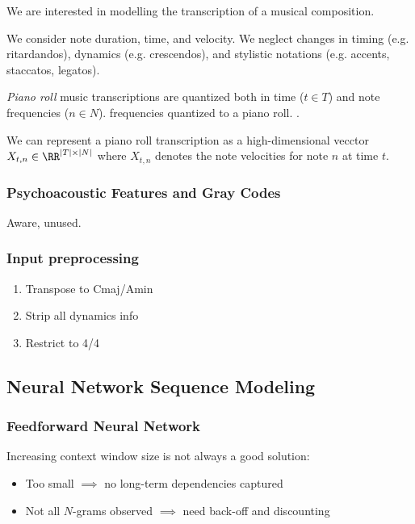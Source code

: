\documentclass[a4paper,oneside,reqno,onecolumn]{amsart}
\begin{document}
We are interested in modelling the transcription of a musical composition.

We consider note duration, time, and velocity. We neglect changes in timing
(e.g. ritardandos), dynamics (e.g. crescendos), and stylistic notations (e.g.
accents, staccatos, legatos).


\emph{Piano roll} music transcriptions are quantized both in time ($t \in T$)
and note frequencies ($n \in N$). frequencies quantized to a piano roll.
.

We can represent a piano roll transcription as a high-dimensional vecctor
$X_{t,n} \in \RR^{|T| \times |N|}$ where $X_{t,n}$ denotes the note velocities
for note $n$ at time $t$.

\subsubsection{Psychoacoustic Features and Gray Codes}

Aware, unused.

\subsubsection{Input preprocessing}

\begin{enumerate}
    \item Transpose to Cmaj/Amin
    \item Strip all dynamics info
    \item Restrict to 4/4
\end{enumerate}

\subsection{Neural Network Sequence Modeling}

\subsubsection{Feedforward Neural Network}

Increasing context window size is not always a good solution:
\begin{itemize}
    \item Too small $\implies$ no long-term dependencies captured
    \item Not all $N$-grams observed $\implies$ need back-off and discounting
\end{itemize}
\end{document}
